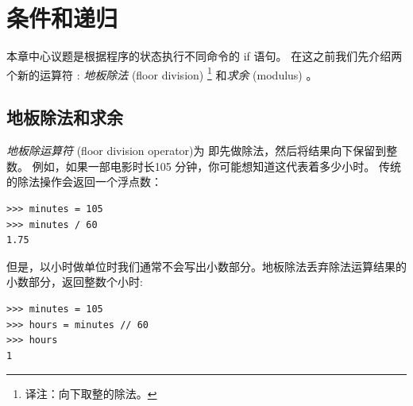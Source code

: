 


\chapter{条件和递归}



本章中心议题是根据程序的状态执行不同命令的 if 语句。 在这之前我们先介绍两个新的运算符 : {\em 地板除法} (floor division) \footnote{译注：向下取整的除法。} 和{\em 求余} (modulus) 。

\section{地板除法和求余}


{\em 地板除运算符} (floor division operator)为 \li{//} 即先做除法，然后将结果向下保留到整数。 例如，如果一部电影时长105 分钟，你可能想知道这代表着多少小时。 传统的除法操作会返回一个浮点数：

\begin{lstlisting}
>>> minutes = 105
>>> minutes / 60
1.75
\end{lstlisting}


但是，以小时做单位时我们通常不会写出小数部分。地板除法丢弃除法运算结果的小数部分，返回整数个小时:

\begin{lstlisting}
>>> minutes = 105
>>> hours = minutes // 60
>>> hours
1
\end{lstlisting}

